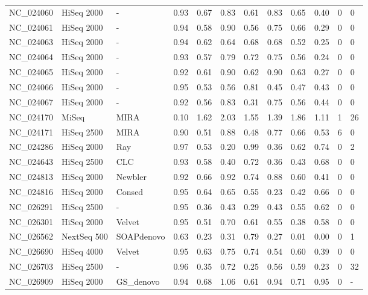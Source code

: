 \begin{table}[ht]
\begin{tabular}{llllllllllll}
  NC\_024060 & HiSeq 2000 & - & 0.93 & 0.67 & 0.83 & 0.61 & 0.83 & 0.65 & 0.40 &   0 &     0 \\ 
  NC\_024061 & HiSeq 2000 & - & 0.94 & 0.58 & 0.90 & 0.56 & 0.75 & 0.66 & 0.29 &   0 &     0 \\ 
  NC\_024063 & HiSeq 2000 & - & 0.94 & 0.62 & 0.64 & 0.68 & 0.68 & 0.52 & 0.25 &   0 &     0 \\ 
  NC\_024064 & HiSeq 2000 & - & 0.93 & 0.57 & 0.79 & 0.72 & 0.75 & 0.56 & 0.24 &   0 &     0 \\ 
  NC\_024065 & HiSeq 2000 & - & 0.92 & 0.61 & 0.90 & 0.62 & 0.90 & 0.63 & 0.27 &   0 &     0 \\ 
  NC\_024066 & HiSeq 2000 & - & 0.95 & 0.53 & 0.56 & 0.81 & 0.45 & 0.47 & 0.43 &   0 &     0 \\ 
  NC\_024067 & HiSeq 2000 & - & 0.92 & 0.56 & 0.83 & 0.31 & 0.75 & 0.56 & 0.44 &   0 &     0 \\ 
  NC\_024170 & MiSeq & MIRA & 0.10 & 1.62 & 2.03 & 1.55 & 1.39 & 1.86 & 1.11 &   1 &    26 \\ 
  NC\_024171 & HiSeq 2500 & MIRA & 0.90 & 0.51 & 0.88 & 0.48 & 0.77 & 0.66 & 0.53 &   6 &     0 \\ 
  NC\_024286 & HiSeq 2000 & Ray & 0.97 & 0.53 & 0.20 & 0.99 & 0.36 & 0.62 & 0.74 &   0 &     2 \\ 
  NC\_024643 & HiSeq 2500 & CLC & 0.93 & 0.58 & 0.40 & 0.72 & 0.36 & 0.43 & 0.68 &   0 &     0 \\ 
  NC\_024813 & HiSeq 2000 & Newbler & 0.92 & 0.66 & 0.92 & 0.74 & 0.88 & 0.60 & 0.41 &   0 &     0 \\ 
  NC\_024816 & HiSeq 2000 & Consed & 0.95 & 0.64 & 0.65 & 0.55 & 0.23 & 0.42 & 0.66 &   0 &     0 \\ 
  NC\_026291 & HiSeq 2500 & - & 0.95 & 0.36 & 0.43 & 0.29 & 0.43 & 0.55 & 0.62 &   0 &     0 \\ 
  NC\_026301 & HiSeq 2000 & Velvet & 0.95 & 0.51 & 0.70 & 0.61 & 0.55 & 0.38 & 0.58 &   0 &     0 \\ 
  NC\_026562 & NextSeq 500 & SOAPdenovo & 0.63 & 0.23 & 0.31 & 0.79 & 0.27 & 0.01 & 0.00 &   0 &     1 \\ 
  NC\_026690 & HiSeq 4000 & Velvet & 0.95 & 0.63 & 0.75 & 0.74 & 0.54 & 0.60 & 0.39 &   0 &     0 \\ 
  NC\_026703 & HiSeq 2500 & - & 0.96 & 0.35 & 0.72 & 0.25 & 0.56 & 0.59 & 0.23 &   0 &    32 \\ 
  NC\_026909 & HiSeq 2000 & GS\_denovo & 0.94 & 0.68 & 1.06 & 0.61 & 0.94 & 0.71 & 0.95 &   0 & - \\ 

\end{tabular}
\end{table}
